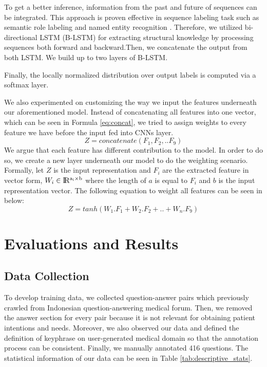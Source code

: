 \documentclass[sigconf]{acmart}
\begin{document}
	To get a better inference, information from the past and future of sequences can be integrated. This approach is proven effective in sequence labeling task such as semantic role labeling \cite{SMRzhou2015end} and named entity recognition \cite{ma2016end}. Therefore, we utilized bi-directional LSTM (B-LSTM) for extracting structural knowledge by processing sequences both forward and backward.Then, we concatenate the output from both LSTM. We build up to two layers of B-LSTM.
	
	Finally, the locally normalized distribution over output labels is computed via a softmax layer.
	
	We also experimented on customizing the way we input the features underneath our aforementioned model. Instead of concatenating all features into one vector, which can be seen in Formula \ref{eq:concat}, we tried to assign weights to every feature we have before the input fed into CNNs layer. 
	\begin{equation}\label{eq:concat}
	Z =  concatenate(F_{1}, F_{2}, ..F_{9})
	\end{equation}
	We argue that each feature has different contribution to the model. In order to do so, we create a new layer underneath our model to do the weighting scenario. Formally, let $Z$ is the input representation and $F_{i}$ are the extracted feature in vector form, $W_i \in {\rm I\!R^{a_i \times b}}$ where the length of $a$ is equal to $F_{i}$ and $b$ is the input representation vector. The following equation to weight all features can be seen in below:
	\begin{equation}
	Z =  tanh(W _{1}.F_{1} + W_{2}.F_{2} + .. + W_{n}.F_{9})
	\end{equation}
	
	
	\section{Evaluations and Results}
	\subsection{Data Collection}
	To develop training data, we collected question-answer pairs which previously crawled from Indonesian question-answering medical forum. Then, we removed the answer section for every pair because it is not relevant for obtaining patient intentions and needs. Moreover, we also observed our data and defined the definition of keyphrase on user-generated medical domain so that the annotation process can be consistent. Finally, we manually annotated 416 questions. The statistical information of our data can be seen in Table \ref{tab:descriptive_stats}.
	
\end{document}
